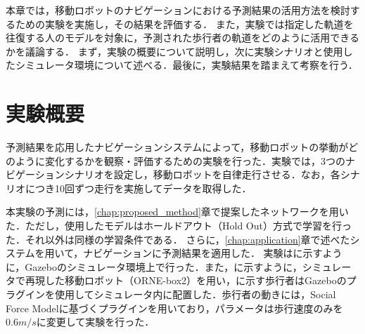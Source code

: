 

本章では，移動ロボットのナビゲーションにおける予測結果の活用方法を検討するための実験を実施し，その結果を評価する．
また，実験では指定した軌道を往復する人のモデルを対象に，予測された歩行者の軌道をどのように活用できるかを議論する．
まず，実験の概要について説明し，次に実験シナリオと使用したシミュレータ環境について述べる．最後に，実験結果を踏まえて考察を行う．

\section{実験概要}
予測結果を応用したナビゲーションシステムによって，移動ロボットの挙動がどのように変化するかを観察・評価するための実験を行った．実験では，3つのナビゲーションシナリオを設定し，移動ロボットを自律走行させる．なお，各シナリオにつき10回ずつ走行を実施してデータを取得した．

本実験の予測には，\ref{chap:proposed_method}章で提案したネットワークを用いた．ただし，使用したモデルはホールドアウト（Hold Out）方式で学習を行った．それ以外は同様の学習条件である．
さらに，\ref{chap:application}章で述べたシステムを用いて，ナビゲーションに予測結果を適用した．
\newpage
実験はに示すように，Gazebo\cite{Gazebo62:online}のシミュレータ環境上で行った．また，に示すように，シミュレータで再現した移動ロボット（ORNE-box2\cite{井口颯人2023屋外自律移動ロボットプラットフォーム-orne}）を用い，に示す歩行者はGazeboのプラグイン\cite{Actors-G87:online}を使用してシミュレータ内に配置した．歩行者の動きには，Social Force Model\cite{s-force-model}に基づくプラグイン\cite{techlife87:online-sfm-plugin}を用いており，パラメータは歩行速度のみを$0.6m/s$に変更して実験を行った．

